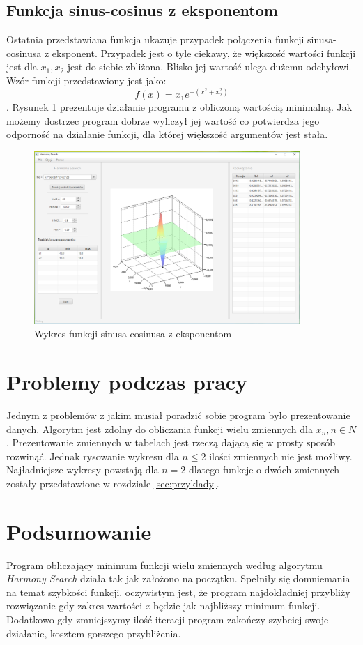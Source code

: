 \documentclass[10pt, a4paper]{article}
\begin{document}
\subsection{Funkcja sinus-cosinus z eksponentom}
\label{subsec:sinexp}
Ostatnia przedstawiana funkcja ukazuje przypadek połączenia funkcji sinusa-cosinusa z eksponent. Przypadek jest o tyle ciekawy, że większość wartości funkcji jest dla {\em $x_{1}, x_{2}$} jest do siebie zbliżona. Blisko jej wartość ulega dużemu odchyłowi.  Wzór funkcji przedstawiony jest jako: $$f(x)=x_{1}e^{-(x_{1}^{2}+x_{2}^2)}$$. Rysunek \ref{fig:6} prezentuje działanie programu z obliczoną wartością minimalną. Jak możemy dostrzec program dobrze wyliczył jej wartość co potwierdza jego odporność na działanie funkcji, dla której większość argumentów jest stała. 
\begin{figure}[htbp]
	\centering
	\includegraphics[width=0.90\textwidth]{images/5.PNG}
	\caption{Wykres funkcji sinusa-cosinusa z eksponentom}
	\label{fig:6}
\end{figure}

\section{Problemy podczas pracy}
\label{sec:problemy}
Jednym z problemów z jakim musiał poradzić sobie program było prezentowanie danych. Algorytm jest zdolny do obliczania funkcji wielu zmiennych dla {\em $x_{n} , n \in N$}. Prezentowanie zmiennych w tabelach jest rzeczą dającą się w prosty sposób rozwinąć. Jednak rysowanie wykresu dla $n \leq 2$ ilości zmiennych nie jest możliwy. Najładniejsze wykresy powstają dla $n = 2$ dlatego funkcje o dwóch zmiennych zostały przedstawione w rozdziale \ref{sec:przyklady}. \\

\section{Podsumowanie}
\label{sec:podsumowanie}
Program obliczający minimum funkcji wielu zmiennych według algorytmu {\em Harmony Search} działa tak jak założono na początku. Spełniły się domniemania na temat szybkości funkcji. oczywistym jest, że program najdokładniej przybliży rozwiązanie gdy zakres wartości {\em x} będzie jak najbliższy minimum funkcji. Dodatkowo gdy zmniejszymy ilość iteracji program zakończy szybciej swoje działanie, kosztem gorszego przybliżenia.

\newpage
{}


\end{document}
